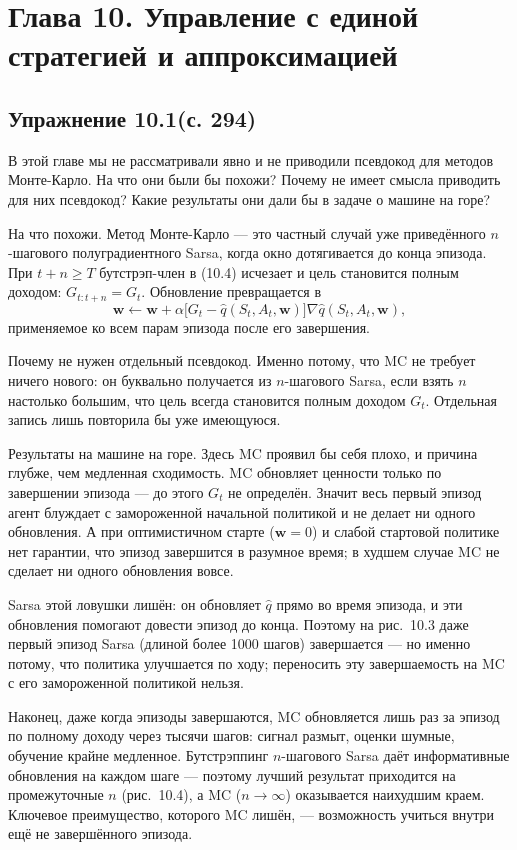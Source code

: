 \section{Глава 10. Управление с единой стратегией и аппроксимацией}

\subsection{Упражнение 10.1(с. 294)}
В этой главе мы не рассматривали явно и не приводили псевдокод для методов
Монте-Карло. На что они были бы похожи? Почему не имеет смысла приводить для них псевдокод? Какие результаты они дали бы в задаче о машине на горе?

\begin{solution}
    На что похожи. Метод Монте-Карло --- это частный случай уже приведённого
    $n$-шагового полуградиентного Sarsa, когда окно дотягивается до конца
    эпизода. При $t+n\ge T$ бутстрэп-член в (10.4) исчезает и цель становится
    полным доходом: $G_{t:t+n}=G_t$. Обновление превращается в
    \begin{equation*}
        \mathbf w \leftarrow \mathbf w + \alpha\big[G_t - \hat q(S_t, A_t, \mathbf w)\big]\nabla\hat q(S_t, A_t, \mathbf w),
    \end{equation*}
    применяемое ко всем парам эпизода после его завершения.

    Почему не нужен отдельный псевдокод. Именно потому, что MC не требует ничего
    нового: он буквально получается из $n$-шагового Sarsa, если взять $n$
    настолько большим, что цель всегда становится полным доходом $G_t$. Отдельная
    запись лишь повторила бы уже имеющуюся.

    Результаты на машине на горе. Здесь MC проявил бы себя плохо, и причина
    глубже, чем медленная сходимость. MC обновляет ценности только по завершении
    эпизода --- до этого $G_t$ не определён. Значит весь первый эпизод агент
    блуждает с замороженной начальной политикой и не делает ни одного обновления.
    А при оптимистичном старте ($\mathbf w=0$) и слабой стартовой политике нет
    гарантии, что эпизод завершится в разумное время; в худшем случае MC не
    сделает ни одного обновления вовсе.

    Sarsa этой ловушки лишён: он обновляет $\hat q$ прямо во время эпизода, и эти
    обновления помогают довести эпизод до конца. Поэтому на рис.~10.3 даже первый
    эпизод Sarsa (длиной более 1000 шагов) завершается --- но именно потому, что
    политика улучшается по ходу; переносить эту завершаемость на MC с его
    замороженной политикой нельзя.

    Наконец, даже когда эпизоды завершаются, MC обновляется лишь раз за эпизод по
    полному доходу через тысячи шагов: сигнал размыт, оценки шумные, обучение
    крайне медленное. Бутстрэппинг $n$-шагового Sarsa даёт информативные
    обновления на каждом шаге --- поэтому лучший результат приходится на
    промежуточные $n$ (рис.~10.4), а MC ($n\to\infty$) оказывается наихудшим
    краем. Ключевое преимущество, которого MC лишён, --- возможность учиться внутри ещё не завершённого эпизода.
\end{solution}

